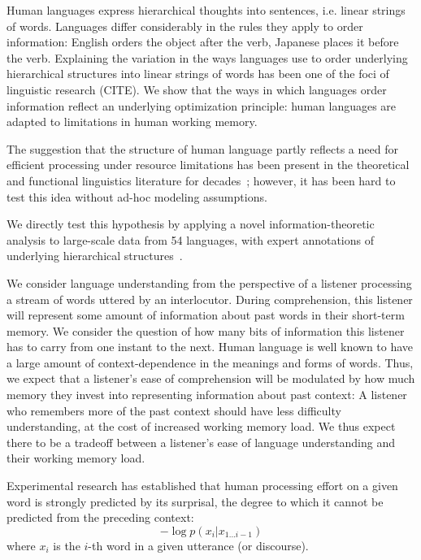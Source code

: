 \documentclass[11pt,letterpaper]{article}
\begin{document}
Human languages express hierarchical thoughts into sentences, i.e. linear strings of words.
Languages differ considerably in the rules they apply to order information: English orders the object after the verb, Japanese places it before the verb.
Explaining the variation in the ways languages use to order underlying hierarchical structures into linear strings of words has been one of the foci of linguistic research (CITE).
We show that the ways in which languages order information reflect an underlying optimization principle: human languages are adapted to limitations in human working memory.

The suggestion that the structure of human language partly reflects a need for efficient processing under resource limitations has been present in the theoretical and functional linguistics literature for decades~\citep{berwick1984grammatical,hawkins1994performance};
however, it has been hard to test this idea without ad-hoc modeling assumptions.

We directly test this hypothesis by applying a novel information-theoretic analysis to large-scale data from 54 languages, with expert annotations of underlying hierarchical structures~\citep{nivre-universal-2017}.

We consider language understanding from the perspective of a listener processing a stream of words uttered by an interlocutor.
During comprehension, this listener will represent some amount of information about past words in their short-term memory.
We consider the question of how many bits of information this listener has to carry from one instant to the next.
Human language is well known to have a large amount of context-dependence in the meanings and forms of words.
Thus, we expect that a listener's ease of comprehension will be modulated by how much memory they invest into representing information about past context:
A listener who remembers more of the past context should have less difficulty understanding, at the cost of increased working memory load.
We thus expect there to be a tradeoff between a listener's ease of language understanding and their working memory load.




Experimental research has established that human processing effort on a given word is strongly predicted by its surprisal, the degree to which it cannot be predicted from the preceding context:
\begin{equation}\label{eq:surp}
	-\log p(x_i|x_{1...i-1})
\end{equation}
where $x_i$ is the $i$-th word in a given utterance (or discourse).
\end{document}
